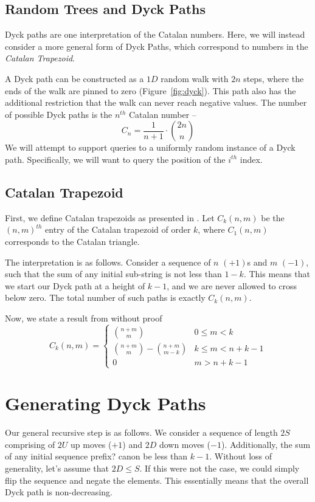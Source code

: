 
\subsection{Random Trees and Dyck Paths}
Dyck paths are one interpretation of the Catalan numbers.
Here, we will instead consider a more general form of Dyck Paths, which correspond to numbers in the \textit{Catalan Trapezoid}.

A Dyck path can be constructed as a $1D$ random walk with $2n$ steps,
where the ends of the walk are pinned to zero (Figure~\ref{fig:dyck}).
This path also has the additional restriction that the walk can never reach negative values.
The number of possible Dyck paths is the $n^{th}$ Catalan number --
$$C_n = \frac{1}{n+1}\cdot {2n\choose n}$$
We will attempt to support queries to a uniformly random instance of a Dyck path.
Specifically, we will want to query the position of the $i^{th}$ index.

\subsection{Catalan Trapezoid}
First, we define Catalan trapezoids as presented in \cite{trap}.
Let $C_k(n,m)$ be the $(n,m)^{th}$ entry of the Catalan trapezoid of order $k$, where $C_1(n,m)$ corresponds to the Catalan triangle.

The interpretation is as follows. Consider a sequence of $n$ $(+1)$s and $m$ $(-1)$,
such that the sum of any initial sub-string is not less than $1-k$.
This means that we start our Dyck path at a height of $k-1$, and we are never allowed to cross below zero.
The total number of such paths is exactly $C_k(n,m)$.

Now, we state a result from \cite{trap} without proof
$$
C_k(n,m)=
\begin{cases}
{n+m}\choose m &0\le m<k\\
{{n+m}\choose{m}} - {{n+m}\choose{m-k}} &k\le m<n+k-1\\
0 &m>n+k-1
\end{cases}
$$

\section{Generating Dyck Paths}
Our general recursive step is as follows.
We consider a sequence of length $2S$ comprising of $2U$ up moves ($+1$) and $2D$ down moves ($-1$).
Additionally, the sum of any initial sequence {\color{red} prefix?} canon be less than $k-1$.
Without loss of generality, let's assume that $2D\le S$. If this were not the case,
we could simply flip the sequence and negate the elements.
This essentially means that the overall Dyck path is non-decreasing.


